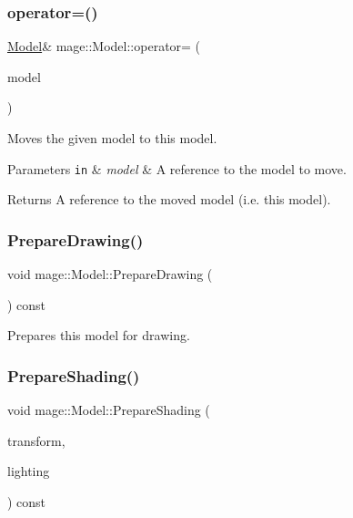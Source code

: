 \subsubsection{\texorpdfstring{operator=()}{operator=()}\hspace{0.1cm}{\footnotesize\ttfamily [2/2]}}
{\footnotesize\ttfamily \hyperlink{classmage_1_1_model}{Model}\& mage\+::\+Model\+::operator= (\begin{DoxyParamCaption}\item[{\hyperlink{classmage_1_1_model}{Model} \&\&}]{model }\end{DoxyParamCaption})\hspace{0.3cm}{\ttfamily [delete]}}

Moves the given model to this model.


\begin{DoxyParams}[1]{Parameters}
\mbox{\tt in}  & {\em model} & A reference to the model to move. \\
\hline
\end{DoxyParams}
\begin{DoxyReturn}{Returns}
A reference to the moved model (i.\+e. this model). 
\end{DoxyReturn}
\hypertarget{classmage_1_1_model_a0083c64e8199db23b78a9281be84685f}{}\label{classmage_1_1_model_a0083c64e8199db23b78a9281be84685f} 
\subsubsection{\texorpdfstring{Prepare\+Drawing()}{PrepareDrawing()}}
{\footnotesize\ttfamily void mage\+::\+Model\+::\+Prepare\+Drawing (\begin{DoxyParamCaption}{ }\end{DoxyParamCaption}) const}

Prepares this model for drawing. \hypertarget{classmage_1_1_model_a14cc836651dc3eeb378d749b24c149d9}{}\label{classmage_1_1_model_a14cc836651dc3eeb378d749b24c149d9} 
\subsubsection{\texorpdfstring{Prepare\+Shading()}{PrepareShading()}}
{\footnotesize\ttfamily void mage\+::\+Model\+::\+Prepare\+Shading (\begin{DoxyParamCaption}\item[{I\+D3\+D11\+Buffer $\ast$}]{transform,  }\item[{const \hyperlink{structmage_1_1_lighting}{Lighting} \&}]{lighting }\end{DoxyParamCaption}) const}

